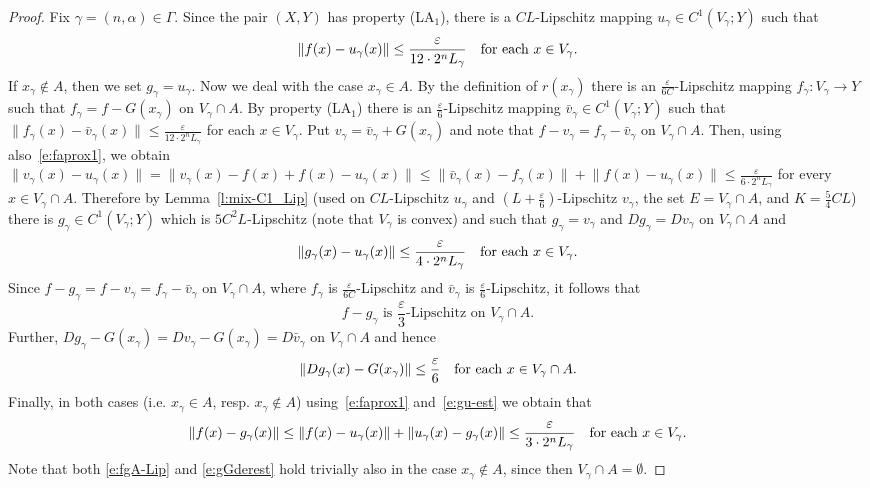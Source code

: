 \documentclass[a4paper,twoside,10pt,reqno,draft]{amsart}
\theoremstyle{definition}
\theoremstyle{remark}
\newcommand\norm[1]{\mathopen\|#1\mathclose\|}
\newcommand\al{\alpha}
\newcommand\ga{\gamma}
\newcommand\Ga{\Gamma}
\newcommand\ve{\varepsilon}
\newcommand\pLA[1]{(LA$_#1$)}
\begin{document}
\begin{proof}
Fix $\ga=(n,\al)\in\Ga$.
Since the pair $(X,Y)$ has property \pLA1, there is a $CL$-Lipschitz mapping $u_\ga\in C^1(V_\ga;Y)$ such that
\begin{equation}\label{e:faprox1}
\norm{f(x)-u_\ga(x)}\le\frac\ve{12\cdot2^nL_\ga}\text{\quad for each $x\in V_\ga$.}
\end{equation}
If $x_\ga\notin A$, then we set $g_\ga=u_\ga$.
Now we deal with the case $x_\ga\in A$.
By the definition of $r(x_\ga)$ there is an $\frac\ve{6C}$-Lipschitz mapping $f_\ga\colon V_\ga\to Y$ such that $f_\ga=f-G(x_\ga)$ on $V_\ga\cap A$.
By property \pLA1 there is an $\frac\ve6$-Lipschitz mapping $\bar v_\ga\in C^1(V_\ga;Y)$ such that $\norm{f_\ga(x)-\bar v_\ga(x)}\le\frac\ve{12\cdot2^nL_\ga}$ for each $x\in V_\ga$.
Put $v_\ga=\bar v_\ga+G(x_\ga)$ and note that $f-v_\ga=f_\ga-\bar v_\ga$ on $V_\ga\cap A$.
Then, using also~\eqref{e:faprox1}, we obtain $\norm{v_\ga(x)-u_\ga(x)}=\norm{v_\ga(x)-f(x)+f(x)-u_\ga(x)}\le\norm{\bar v_\ga(x)-f_\ga(x)}+\norm{f(x)-u_\ga(x)}\le\frac\ve{6\cdot2^nL_\ga}$ for every $x\in V_\ga\cap A$.
Therefore by Lemma~\ref{l:mix-C1_Lip} (used on $CL$-Lipschitz $u_\ga$ and $(L+\frac\ve6)$-Lipschitz $v_\ga$, the set $E=V_\ga\cap A$, and $K=\frac54CL$) there is $g_\ga\in C^1(V_\ga;Y)$ which is $5C^2L$-Lipschitz (note that $V_\ga$ is convex)
and such that $g_\ga=v_\ga$ and $Dg_\ga=Dv_\ga$ on $V_\ga\cap A$ and
\begin{equation}\label{e:gu-est}
\norm{g_\ga(x)-u_\ga(x)}\le\frac\ve{4\cdot2^nL_\ga}\text{\quad for each $x\in V_\ga$.}
\end{equation}
Since $f-g_\ga=f-v_\ga=f_\ga-\bar v_\ga$ on $V_\ga\cap A$, where $f_\ga$ is $\frac\ve{6C}$-Lipschitz and $\bar v_\ga$ is $\frac\ve6$-Lipschitz, it follows that
\begin{equation}\label{e:fgA-Lip}
\text{$f-g_\ga$ is $\frac\ve3$-Lipschitz on $V_\ga\cap A$.}
\end{equation}
Further, $Dg_\ga-G(x_\ga)=Dv_\ga-G(x_\ga)=D\bar v_\ga$ on $V_\ga\cap A$ and hence
\begin{equation}\label{e:gGderest}
\norm{Dg_\ga(x)-G(x_\ga)}\le\frac\ve6\text{\quad for each $x\in V_\ga\cap A$.}
\end{equation}
Finally, in both cases (i.e. $x_\ga\in A$, resp. $x_\ga\notin A$) using~\eqref{e:faprox1} and~\eqref{e:gu-est} we obtain that
\begin{equation}\label{e:faprox}
\norm{f(x)-g_\ga(x)}\le\norm{f(x)-u_\ga(x)}+\norm{u_\ga(x)-g_\ga(x)}\le\frac\ve{3\cdot2^nL_\ga}\text{\quad for each $x\in V_\ga$.}
\end{equation}
Note that both \eqref{e:fgA-Lip} and \eqref{e:gGderest} hold trivially also in the case $x_\ga\notin A$, since then $V_\ga\cap A=\emptyset$.


\end{proof}
\end{document}
